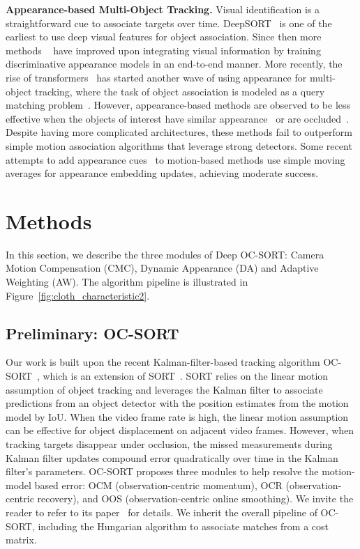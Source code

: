 \documentclass{article}
\begin{document}
\noindent \textbf{Appearance-based Multi-Object Tracking.}
Visual identification is a straightforward cue to associate targets over time. DeepSORT~\cite{deepsort} is one of the earliest to use deep visual features for object association. Since then more methods ~\cite{zhang2021fairmot,pang2021quasi,cao2022track} have improved upon integrating visual information by training discriminative appearance models in an end-to-end manner. More recently, the rise of transformers~\cite{vaswani2017attention} has started another wave of using appearance for multi-object tracking, where the task of object association is modeled as a query matching problem~\cite{zeng2021motr,sun2020transtrack,meinhardt2021trackformer,cao2022track}. However, appearance-based methods are observed to be less effective when the objects of interest have similar appearance~\cite{sun2021dancetrack} or are occluded~\cite{dendorfer2020mot20,sun2021dancetrack}. Despite having more complicated architectures, these methods fail to outperform simple motion association algorithms that leverage strong detectors. Some recent attempts to add appearance cues~\cite{botsort,strongsort} to motion-based methods use simple moving averages for appearance embedding updates, achieving moderate success. 

\section{Methods}
\label{sec:methods}
\vspace{-0.2cm}
In this section, we describe the three modules of Deep OC-SORT: Camera Motion Compensation (CMC), Dynamic Appearance (DA) and Adaptive Weighting (AW). The algorithm pipeline is illustrated in Figure~\ref{fig:cloth_characteristic2}. 

\subsection{Preliminary: OC-SORT}
Our work is built upon the recent Kalman-filter-based tracking algorithm OC-SORT~\cite{cao2022observation}, which is an extension of SORT~\cite{bewley2016simple}. SORT relies on the linear motion assumption of object tracking and leverages the Kalman filter to associate predictions from an object detector with the position estimates from the motion model by IoU. When the video frame rate is high, the linear motion assumption can be effective for object displacement on adjacent video frames. However, when tracking targets disappear under occlusion, the missed measurements during Kalman filter updates compound error quadratically over time in the Kalman filter's parameters. OC-SORT proposes three modules to help resolve the motion-model based error: OCM (observation-centric momentum), OCR (observation-centric recovery), and OOS (observation-centric online smoothing). We invite the reader to refer to its paper~\cite{cao2022observation} for details.
We inherit the overall pipeline of OC-SORT, including the Hungarian algorithm to associate matches from a cost matrix. 
\end{document}
